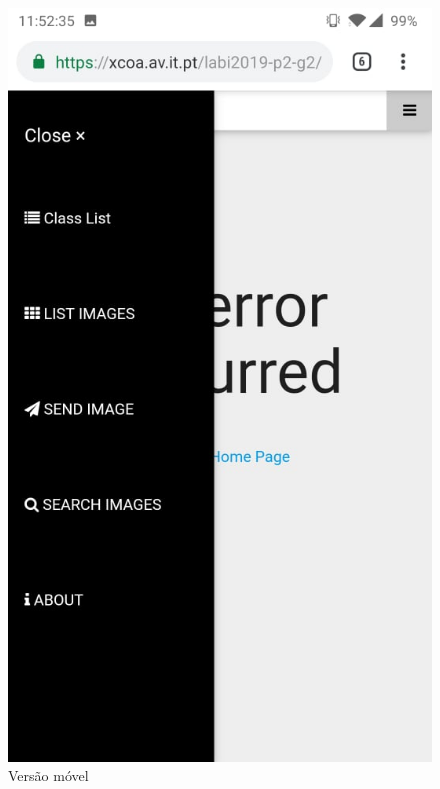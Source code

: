 \documentclass{report}
\begin{document}
\begin{figure}[H]
\includegraphics[width=\textwidth]{mobile.jpg}
\caption{Versão móvel}
\label{Fig10}
\end{figure}
\end{document}

